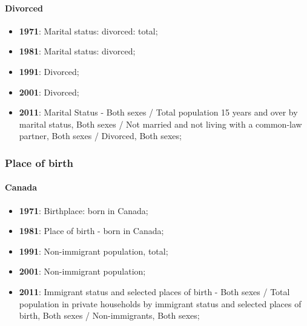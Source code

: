 \documentclass[a4paper]{article}
\begin{document}
\paragraph{Divorced}
\begin{itemize}
   \item{\textbf{1971}:  Marital status: divorced: total;}
   \item{\textbf{1981}:  Marital status: divorced;}
   \item{\textbf{1991}:  Divorced;}
   \item{\textbf{2001}:  Divorced;}
   \item{\textbf{2011}:  Marital Status - Both sexes / Total population 15 years and over by marital status, Both sexes / Not married and not living with a common-law partner, Both sexes / Divorced, Both sexes;}
\end{itemize}

\subsubsection{Place of birth}
\paragraph{Canada}
\begin{itemize}
   \item{\textbf{1971}:  Birthplace: born in Canada;}
   \item{\textbf{1981}:  Place of birth - born in Canada;}
   \item{\textbf{1991}:  Non-immigrant population, total;}
   \item{\textbf{2001}:  Non-immigrant population;}
   \item{\textbf{2011}:  Immigrant status and selected places of birth - Both sexes / Total population in private households by immigrant status and selected places of birth, Both sexes / Non-immigrants, Both sexes;}
\end{itemize}
\end{document}
